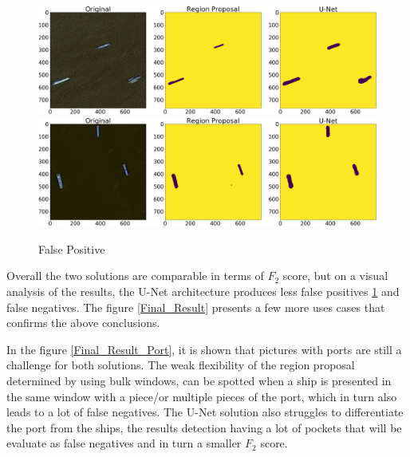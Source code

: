 \begin{figure}[H]
	\includegraphics[width=\textwidth]{Pictures/016Comparison1.png}\\
	\includegraphics[width=\textwidth]{Pictures/016Comparison2.png}
	\caption{False Positive}
	\label{false_positive}
\end{figure}

Overall the two solutions are comparable in terms of $F_2$ score, but on a visual analysis of the results, the U-Net architecture produces less false positives \ref{false_positive} and false negatives. The figure \ref{Final_Result} presents a few more uses cases that confirms the above conclusions.

In the figure \ref{Final_Result_Port}, it is shown that pictures with ports are still a challenge for both solutions. The weak flexibility of the region proposal determined by using bulk windows, can be spotted when a ship is presented in the same window with a piece/or multiple pieces of the port, which in turn also leads to a lot of false negatives. The U-Net solution also struggles to differentiate the port from the ships, the results detection having a lot of pockets that will be evaluate as false negatives and in turn a smaller $F_2$ score.

